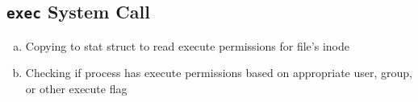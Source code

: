 \documentclass[11pt,letterpaper]{report}
\begin{document}
                                                                                                                                                                                                                                                                                                                                                                                                                                                                                              \subsection*{{\tt exec} System Call}
                                                                                                                                                                                                                                                                                                                                                                                                                                                                                                \begin{enumerate}[(a)]
                                                                                                                                                                                                                                                                                                                                                                                                                                                                                                      \item Copying to stat struct to read execute permissions for file’s inode
                                                                                                                                                                                                                                                                                                                                                                                                                                                                                                            \item Checking if process has execute permissions based on appropriate user, group, or other execute
                                                                                                                                                                                                                                                                                                                                                                                                                                                                                                            flag

\end{enumerate}
\end{document}
